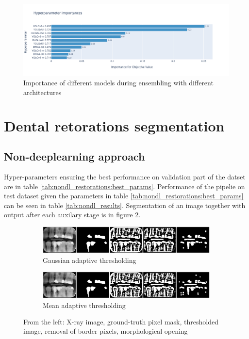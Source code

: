 \begin{figure}
    \centering
    \includegraphics[width=\linewidth]{images/ensemble_all_importance.pdf}
    \caption{Importance of different models during ensembling with different architectures}
    \label{fig:ensembling_parameters_importance}
\end{figure}

\section{Dental retorations segmentation}
\label{sec:dental_restoration_results}
\subsection{Non-deeplearning approach}
Hyper-parameters ensuring the best performance on validation part of the datset are in table \ref{tab:nondl_restorations:best_params}. Performance of the pipelie on test dataset given the parameters in table \ref{tab:nondl_restorations:best_params} can be seen in table \ref{tab:nondl_results}. Segmentation of an image together with output after each auxilary stage is in figure \ref{fig:segmentation_sample_nondl}.

\begin{figure}[h]
    \centering
    \begin{subfigure}[b]{\textwidth}
        \includegraphics[width=1\linewidth]{images/segmentation_nondl_gauss_12.pdf}
        \caption{Gaussian adaptive thresholding}
    \end{subfigure}

    \begin{subfigure}[b]{\textwidth}
        \includegraphics[width=1\linewidth]{images/segmentation_nondl_mean_12.pdf}
        \caption{Mean adaptive thresholding}
    \end{subfigure}
    \caption{From the left: X-ray image, ground-truth pixel mask, thresholded image, removal of border pixels, morphological opening}
    \label{fig:segmentation_sample_nondl}
\end{figure}

